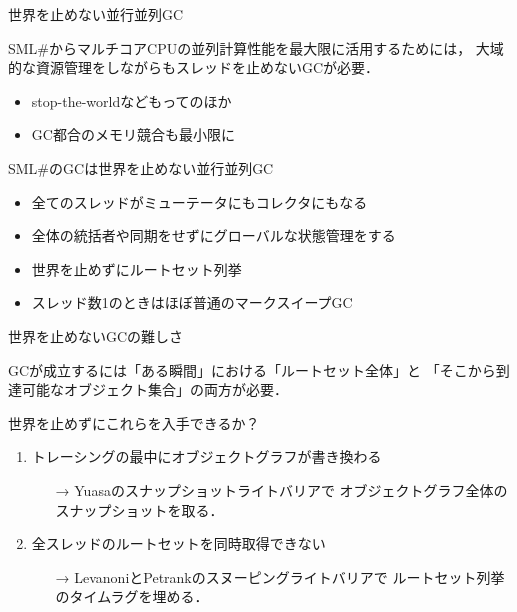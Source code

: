 \documentclass[aspectratio=169,t,dvipdfmx,12pt]{beamer}
\newcommand\smlsharp{SML\#}
\begin{document}
\begin{frame}{世界を止めない並行並列GC}

\smlsharp{}からマルチコアCPUの並列計算性能を最大限に活用するためには，
大域的な資源管理をしながらもスレッドを止めないGCが必要．
\begin{itemize}
\item stop-the-worldなどもってのほか
\item GC都合のメモリ競合も最小限に
\end{itemize}

\bigskip

\smlsharp{}のGCは世界を止めない並行並列GC
\begin{itemize}
\item 全てのスレッドがミューテータにもコレクタにもなる
\item 全体の統括者や同期をせずにグローバルな状態管理をする
\item 世界を止めずにルートセット列挙
\item スレッド数1のときはほぼ普通のマークスイープGC
\end{itemize}

\end{frame}

\begin{frame}{世界を止めないGCの難しさ}

GCが成立するには「ある瞬間」における「ルートセット全体」と
「そこから到達可能なオブジェクト集合」の両方が必要．

\bigskip

世界を止めずにこれらを入手できるか？

\bigskip

\begin{enumerate}
\item トレーシングの最中にオブジェクトグラフが書き換わる
\begin{itemize}
\item[→]\normalsize Yuasaのスナップショットライトバリアで
オブジェクトグラフ全体のスナップショットを取る．
\end{itemize}
\bigskip
\item 全スレッドのルートセットを同時取得できない
\begin{itemize}
\item[→]\normalsize LevanoniとPetrankのスヌーピングライトバリアで
ルートセット列挙のタイムラグを埋める．
\end{itemize}
\end{enumerate}

\end{frame}
\end{document}
